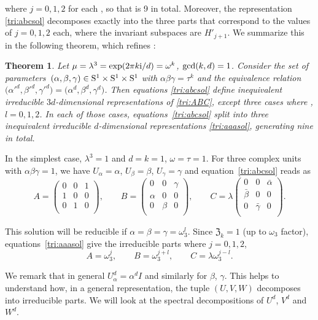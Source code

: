 \documentclass[pdftex]{sigma}
\numberwithin{equation}{section}
\newtheorem{Theorem}{Theorem}[section]
\newcommand{\bmp}{\begin{pmatrix}}
\newcommand{\emp}{\end{pmatrix}}
\begin{document}
where $j=0,1,2$ for each , so that is 9 in total.
Moreover, the representation \eqref{tri:abcsol} decomposes exactly into
the three parts that correspond to the values of $j=0,1,2$ each, where the invariant subspaces are
$H'_{j+1}$.
We summarize this in the following theorem, which refines \cite[Theorem~5]{RL}:
\begin{Theorem}\label{tri:thm}
Let $\mu = \lambda^3 = \exp (2\pi k {\rm i}/d) = \omega^k$, ${\rm gcd}(k,d)=1$.
Consider the set of parameters~${(\alpha, \beta, \gamma) \in {\rm S}^1 \times {\rm S}^1 \times {\rm S}^1}$
with $\alpha\beta\gamma = \tau^k$ and
the equivalence relation $\bigl(\alpha'^d, \beta'^d, \gamma'^d\bigr) = \bigl(\alpha^d, \beta^d, \gamma^d\bigr)$.
Then equations \eqref{tri:abcsol}
define inequivalent irreducible $3d$-dimensional representations of \eqref{tri:ABC},
except three cases where , $l=0,1,2$.
In each of those cases, equations~\eqref{tri:abcsol} split into three inequivalent irreducible
$d$-dimensional representations \eqref{tri:aaasol}, generating nine in total.
\end{Theorem}

In the simplest case, $\lambda^3 = 1$ and $d=k=1$, $\omega=\tau=1$. For three complex units with
$\alpha\beta\gamma=1$, we have $U_\alpha = \alpha$, $U_\beta = \beta$, $U_\gamma = \gamma$ and
equation~\eqref{tri:abcsol} reads as
\[
A = \bmp
0 & 0 & 1 \\
1 & 0 & 0 \\
0 & 1 & 0 \\
\emp,
\qquad
B = \bmp
0 & 0 & \gamma \\
\alpha & 0 & 0 \\
0 & \beta & 0 \\
\emp,
\qquad
C = \lambda\bmp
0 & 0 & \bar{\alpha} \\
\bar{\beta} & 0 & 0 \\
0 & \bar{\gamma} & 0 \\
\emp.
\]

This solution will be reducible if $\alpha=\beta=\gamma=\omega_3^l$.
Since $\mathfrak{Z}_k=1$ (up to $\omega_3$ factor), equations~\eqref{tri:aaasol} give the irreducible parts where $j=0,1,2$,
\[
 A = \omega_3^j,
\qquad B = \omega_3^{j+l},
\qquad C = \lambda \omega_3^{j-l}.
\]

We remark that in general $U_\alpha^d = \alpha^d I$ and similarly for $\beta$, $\gamma$.
This helps to understand how, in a general representation, the tuple $(U,V,W)$ decomposes into
irreducible parts. We will look at the spectral decompositions of $U^d$, $V^d$ and $W^d$.
\end{document}
